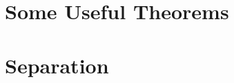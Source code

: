 \documentclass[12pt]{article}
\begin{document}

\section{Some Useful Theorems}


\section{Separation}


%
%
%
%
% 
%
% 
\end{document}
